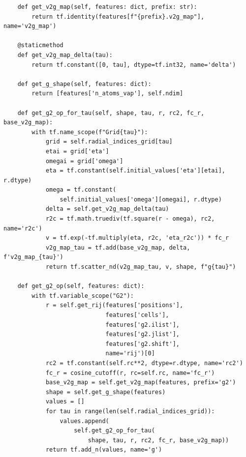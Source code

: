 \documentclass[final,1p,times]{elsarticle}
\begin{document}
\begin{verbatim}
    def get_v2g_map(self, features: dict, prefix: str):
        return tf.identity(features[f"{prefix}.v2g_map"], name='v2g_map')

    @staticmethod
    def get_v2g_map_delta(tau):
        return tf.constant([0, tau], dtype=tf.int32, name='delta')

    def get_g_shape(self, features: dict):
        return [features['n_atoms_vap'], self.ndim]

    def get_g2_op_for_tau(self, shape, tau, r, rc2, fc_r, base_v2g_map):
        with tf.name_scope(f"Grid{tau}"):
            grid = self.radial_indices_grid[tau]
            etai = grid['eta']
            omegai = grid['omega']
            eta = tf.constant(self.initial_values['eta'][etai], r.dtype)
            omega = tf.constant(
                self.initial_values['omega'][omegai], r.dtype)
            delta = self.get_v2g_map_delta(tau)
            r2c = tf.math.truediv(tf.square(r - omega), rc2, name='r2c')
            v = tf.exp(-tf.multiply(eta, r2c, 'eta_r2c')) * fc_r
            v2g_map_tau = tf.add(base_v2g_map, delta, f'v2g_map_{tau}')
            return tf.scatter_nd(v2g_map_tau, v, shape, f"g{tau}")

    def get_g2_op(self, features: dict):
        with tf.variable_scope("G2"):
            r = self.get_rij(features['positions'],
                             features['cells'],
                             features['g2.ilist'],
                             features['g2.jlist'],
                             features['g2.shift'],
                             name='rij')[0]
            rc2 = tf.constant(self.rc**2, dtype=r.dtype, name='rc2')
            fc_r = cosine_cutoff(r, rc=self.rc, name='fc_r')
            base_v2g_map = self.get_v2g_map(features, prefix='g2')
            shape = self.get_g_shape(features)
            values = []
            for tau in range(len(self.radial_indices_grid)):
                values.append(
                    self.get_g2_op_for_tau(
                        shape, tau, r, rc2, fc_r, base_v2g_map))
            return tf.add_n(values, name='g')


\end{verbatim}
\end{document}
